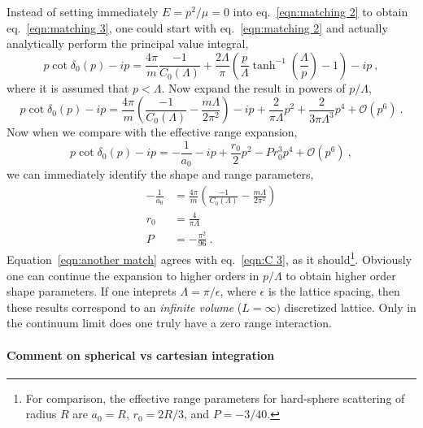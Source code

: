 \documentclass[11pt]{article}
\begin{document}
Instead of setting immediately $E=p^2/\mu = 0$ into eq.~\eqref{eqn:matching 2} to obtain eq.~\eqref{eqn:matching 3}, one could start with eq.~\eqref{eqn:matching 2} and actually analytically perform the principal value integral,
\begin{equation}\label{eqn:effective range 1}
p\cot \delta_0(p)-ip=\frac{4\pi}{m}\frac{-1}{C_0(\Lambda)}+\frac{2\Lambda}{\pi} \left(\frac{p}{\Lambda} \tanh ^{-1}\left(\frac{\Lambda }{p}\right)-1 \right)-ip\ ,
\end{equation}
where it is assumed that $p<\Lambda$.  Now expand the result in powers of $p/\Lambda$, 
\begin{equation}\label{eqn:effective range 2}
p\cot \delta_0(p)-ip=\frac{4\pi}{m}\left(\frac{-1}{C_0(\Lambda)}-\frac{m\Lambda}{2\pi^2}\right)-ip+\frac{2}{\pi\Lambda}p^2+\frac{2}{3\pi\Lambda^3}p^4+\mathcal{O}(p^6)\ .
\end{equation}
Now when we compare with the effective range expansion,
\begin{displaymath}
p\cot \delta_0(p)-ip=-\frac{1}{a_0}-ip+\frac{r_0}{2}p^2-Pr_0^3p^4+\mathcal{O}(p^6)\ ,
\end{displaymath}
we can immediately identify the shape and range parameters,
\begin{align}
-\frac{1}{a_0}&=\frac{4\pi}{m}\left(\frac{-1}{C_0(\Lambda)}-\frac{m\Lambda}{2\pi^2}\right)\label{eqn:another match}\\
r_0 &= \frac{4}{\pi\Lambda}\\
P &= -\frac{\pi^2}{96}\ .
\end{align}
Equation~\eqref{eqn:another match} agrees with eq.~\eqref{eqn:C 3}, as it should\footnote{For comparison, the effective range parameters for hard-sphere scattering of radius $R$ are $a_0=R$, $r_0=2R/3$, and $P=-3/40$.}.  Obviously one can continue the expansion to higher orders in $p/\Lambda$ to obtain higher order shape parameters.  If one inteprets $\Lambda=\pi/\epsilon$, where $\epsilon$ is the lattice spacing, then these results correspond to an \emph{infinite volume} ($L=\infty)$ discretized lattice.  Only in the continuum limit does one truly have a zero range interaction.  

\paragraph{Comment on spherical vs cartesian integration\\}
\end{document}

